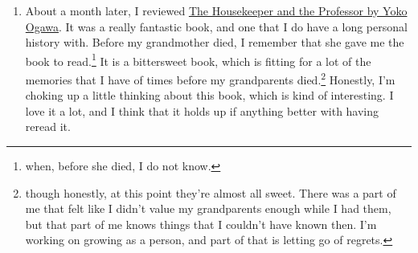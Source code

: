 \documentclass[12pt]{article}[titlepage]
\newcommand{\1}{\={a}}
\newcommand{\2}{\={e}}
\newcommand{\3}{\={\i}}
\newcommand{\4}{\=o}
\newcommand{\5}{\=u}
\newcommand{\6}{\={A}}
\renewcommand{\,}{\textsuperscript{,}}
\begin{document}
\begin{enumerate}
If I remember correctly, the second book is written, appropriately enough, in second person.\footnote{appropriate here because if my memory serves, the first book is written in first person, and also I like the fact that book two is written in person two.
I guess that can't work if there's more than three books in the series, because fourth person isn't a thing.
(I wonder what fourth person could mean.
If we think about it, first person is referring to self, second person refers to the other participant in the conversation.
Third person refers to something not a part of the conversation.
I know that there are languages that divide the world differently, but I don't think linguistics needs more people.
Ope. I've looked it up, and there are evidences of persons after third.
Apparently some languages treat referring to someone nearby and somewhere far away differently.
When they do, the latter is sometimes considered fourth person.
There's also a reference to fifth person, so that's interesting.
Otherwise, fourth person is sometimes used in languages that treat generic referents differently than the standard third person (e.g. one should not).
That's kind of cool, and something worth thinking about for any future ConLang I work on.)
Ok, so it could work with more than three books when translated.}
\item About a month later, I reviewed \href{book-review-housekeeper-professor-ogawa.html}{The Housekeeper and the Professor by Yoko Ogawa}.
It was a really fantastic book, and one that I do have a long personal history with.
Before my grandmother died, I remember that she gave me the book to read.\footnote{when, before she died, I do not know.}
It is a bittersweet book, which is fitting for a lot of the memories that I have of times before my grandparents died.\footnote{though honestly, at this point they're almost all sweet.
There was a part of me that felt like I didn't value my grandparents enough while I had them, but that part of me knows things that I couldn't have known then.
I'm working on growing as a person, and part of that is letting go of regrets.}
Honestly, I'm choking up a little thinking about this book, which is kind of interesting.
I love it a lot, and I think that it holds up if anything better with having reread it.


\end{enumerate}
\end{document}
